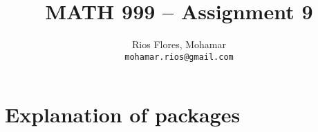 \newcommand{\preamblefolder}{./include}


\usepackage[pdfauthor={Mohamar Rios Flores},%
            pdftitle={MATH 999 - Assignment 9},%
            pdffitwindow=false,%
            bookmarks=false,%
            unicode=true,%
            pdftex]{hyperref}
\usepackage{amsrefs} %


\title{MATH 999 -- Assignment 9}
\author{
  Rios Flores, Mohamar\\
  \texttt{mohamar.rios@gmail.com}%
%
  }


  
  \maketitle

\section*{Explanation of packages}

